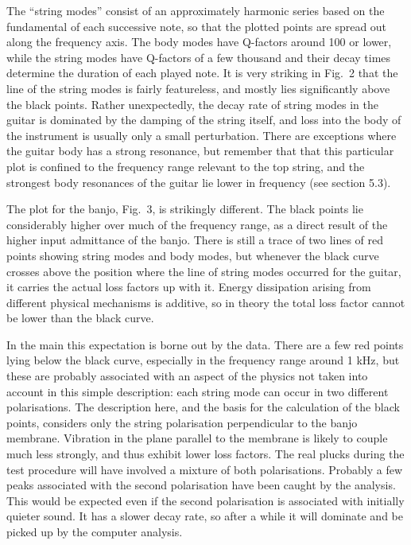   The ``string modes'' consist of an approximately harmonic series based on the 
  fundamental of each successive note, so that the plotted points are spread 
  out along the frequency axis. The body modes have Q-factors around 100 or 
  lower, while the string modes have Q-factors of a few thousand and their 
  decay times determine the duration of each played note. It is very striking 
  in Fig.\ 2 that the line of the string modes is fairly featureless, and 
  mostly lies significantly above the black points. Rather unexpectedly, the 
  decay rate of string modes in the guitar is dominated by the damping of the 
  string itself, and loss into the body of the instrument is usually only a 
  small perturbation. There are exceptions where the guitar body has a strong 
  resonance, but remember that that this particular plot is confined to the 
  frequency range relevant to the top string, and the strongest body resonances 
  of the guitar lie lower in frequency (see section 5.3). 

  The plot for the banjo, Fig.\ 3, is strikingly different. The black points 
  lie considerably higher over much of the frequency range, as a direct result 
  of the higher input admittance of the banjo. There is still a trace of two 
  lines of red points showing string modes and body modes, but whenever the 
  black curve crosses above the position where the line of string modes 
  occurred for the guitar, it carries the actual loss factors up with it. 
  Energy dissipation arising from different physical mechanisms is additive, so 
  in theory the total loss factor cannot be lower than the black curve. 

  In the main this expectation is borne out by the data. There are a few red 
  points lying below the black curve, especially in the frequency range around 
  1 kHz, but these are probably associated with an aspect of the physics not 
  taken into account in this simple description: each string mode can occur in 
  two different polarisations. The description here, and the basis for the 
  calculation of the black points, considers only the string polarisation 
  perpendicular to the banjo membrane. Vibration in the plane parallel to the 
  membrane is likely to couple much less strongly, and thus exhibit lower loss 
  factors. The real plucks during the test procedure will have involved a 
  mixture of both polarisations. Probably a few peaks associated with the 
  second polarisation have been caught by the analysis. This would be expected 
  even if the second polarisation is associated with initially quieter sound. 
  It has a slower decay rate, so after a while it will dominate and be picked 
  up by the computer analysis. 

